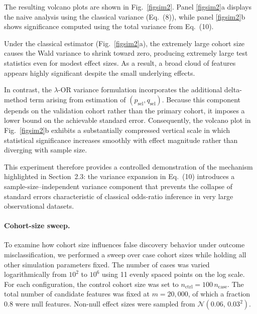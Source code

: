 \documentclass[pdflatex,sn-mathphys-num]{sn-jnl}%
\theoremstyle{thmstyleone}%
\theoremstyle{thmstyletwo}%
\theoremstyle{thmstylethree}%
\begin{document}
The resulting volcano plots are shown in Fig.~\ref{figsim2}.  Panel
\ref{figsim2}a displays the naive analysis using the classical variance
(Eq.~(8)), while panel \ref{figsim2}b shows significance computed using the
total variance from Eq.~(10).

Under the classical estimator (Fig.~\ref{figsim2}a), the extremely large cohort
size causes the Wald variance to shrink toward zero, producing extremely large
test statistics even for modest effect sizes.  As a result, a broad cloud of
features appears highly significant despite the small underlying effects.

In contrast, the $\lambda$-OR variance formulation incorporates the additional
delta-method term arising from estimation of $(p_{\mathrm{sel}},q_{\mathrm{sel}})$.
Because this component depends on the validation cohort rather than the primary
cohort, it imposes a lower bound on the achievable standard error.  Consequently,
the volcano plot in Fig.~\ref{figsim2}b exhibits a substantially compressed
vertical scale in which statistical significance increases smoothly with effect
magnitude rather than diverging with sample size.

This experiment therefore provides a controlled demonstration of the mechanism
highlighted in Section~2.3: the variance expansion in Eq.~(10) introduces a
sample-size–independent variance component that prevents the collapse of
standard errors characteristic of classical odds-ratio inference in very large
observational datasets.


\paragraph{Cohort-size sweep.}
To examine how cohort size influences false discovery behavior under outcome misclassification, we performed a sweep over case cohort sizes while holding all other simulation parameters fixed. The number of cases was varied logarithmically from $10^{2}$ to $10^{6}$ using 11 evenly spaced points on the log scale. For each configuration, the control cohort size was set to $n_{\mathrm{ctrl}} = 100\, n_{\mathrm{case}}$. The total number of candidate features was fixed at $m=20{,}000$, of which a fraction $0.8$ were null features. Non-null effect sizes were sampled from $\mathcal{N}(0.06,\,0.03^{2})$. %
\end{document}
